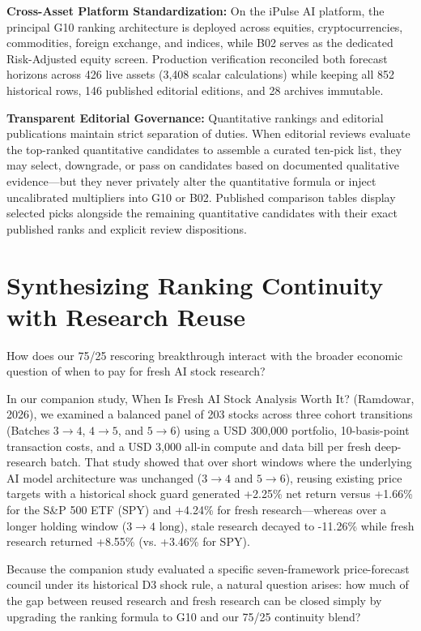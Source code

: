 \documentclass[11pt,a4paper]{article}
\numberwithin{table}{section}
\begin{document}
\textbf{Cross-Asset Platform Standardization:}  On the iPulse AI platform, the principal G10 ranking architecture is deployed across equities, cryptocurrencies, commodities, foreign exchange, and indices, while B02 serves as the dedicated Risk-Adjusted equity screen. Production verification reconciled both forecast horizons across 426 live assets (3,408 scalar calculations) while keeping all 852 historical rows, 146 published editorial editions, and 28 archives immutable.

\textbf{Transparent Editorial Governance:}  Quantitative rankings and editorial publications maintain strict separation of duties. When editorial reviews evaluate the top-ranked quantitative candidates to assemble a curated ten-pick list, they may select, downgrade, or pass on candidates based on documented qualitative evidence---but they never privately alter the quantitative formula or inject uncalibrated multipliers into G10 or B02. Published comparison tables display selected picks alongside the remaining quantitative candidates with their exact published ranks and explicit review dispositions.

\section{Synthesizing Ranking Continuity with Research Reuse}

How does our 75/25 rescoring breakthrough interact with the broader economic question of when to pay for fresh AI stock research?

In our companion study, When Is Fresh AI Stock Analysis Worth It? (Ramdowar, 2026), we examined a balanced panel of 203 stocks across three cohort transitions (Batches $3\to 4$, $4\to 5$, and $5\to 6$) using a USD 300,000 portfolio, 10-basis-point transaction costs, and a USD 3,000 all-in compute and data bill per fresh deep-research batch. That study showed that over short windows where the underlying AI model architecture was unchanged ($3\to 4$ and $5\to 6$), reusing existing price targets with a historical shock guard generated +2.25\% net return versus +1.66\% for the S\&P 500 ETF (SPY) and +4.24\% for fresh research---whereas over a longer holding window ($3\to 4\text{ long}$), stale research decayed to -11.26\% while fresh research returned +8.55\% (vs. +3.46\% for SPY).

Because the companion study evaluated a specific seven-framework price-forecast council under its historical D3 shock rule, a natural question arises: how much of the gap between reused research and fresh research can be closed simply by upgrading the ranking formula to G10 and our 75/25 continuity blend?
\end{document}
